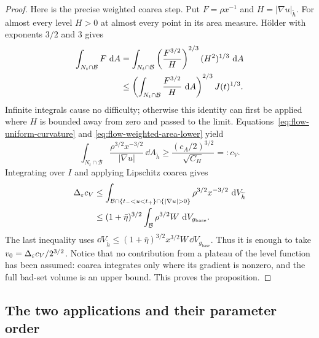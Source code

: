 \begin{proof}
Here is the precise weighted coarea step.  Put $F=\rho x^{-1}$ and
$H=|\nabla u|_{\widetilde h}$.  For almost every level $H>0$ at
almost every point in its area measure.  H\"older with exponents
$3/2$ and $3$ gives
\begin{align}\label{eq:flow-holder-exponents}
 \int_{N_t\cap\mathcal B}F\,\mathop{}\!\mathrm d A
 &=\int_{N_t\cap\mathcal B}
       \left(\frac{F^{3/2}}H\right)^{2/3}(H^2)^{1/3}\,\mathop{}\!\mathrm d A\notag\\
 &\le
 \left(\int_{N_t\cap\mathcal B}\frac{F^{3/2}}H\,\mathop{}\!\mathrm d A\right)^{2/3}
 J(t)^{1/3}.
\end{align}
Infinite integrals cause no difficulty; otherwise this identity can
first be applied where $H$ is bounded away from zero and passed to
the limit.  Equations~\eqref{eq:flow-uniform-curvature} and
\eqref{eq:flow-weighted-area-lower} yield
\begin{equation}\label{eq:flow-level-volume-lower}
 \int_{N_t\cap\mathcal B}
       \frac{\rho^{3/2}x^{-3/2}}{|\nabla u|}\,\dd A_{\widetilde h}
 \ge \frac{(c_A/2)^{3/2}}{\sqrt{C_H}}=:c_V.
\end{equation}
Integrating over $I$ and applying Lipschitz coarea gives
\begin{align}\label{eq:flow-coarea-contradiction}
 \Delta_\eps c_V
 &\le\int_{\mathcal B\cap\{t_-<u<t_+\}\cap\{|\nabla u|>0\}}
                  \rho^{3/2}x^{-3/2}\,\dd V_{\widetilde h}\notag\\
 &\le(1+\bar\eta)^{3/2}
       \int_{\mathcal B}\rho^{3/2}W\,\dd V_{g_{\mathrm{base}}}.
\end{align}
The last inequality uses
$\dd V_{\widetilde h}\le
(1+\bar\eta)^{3/2}x^{3/2}W\,\dd V_{g_{\mathrm{base}}}$.
Thus it is enough to take
$v_0=\Delta_\varepsilon c_V/2^{3/2}$.
Notice that no contribution from a plateau of the level function
has been assumed: coarea integrates only where its gradient is
nonzero, and the full bad-set volume is an upper bound.  This proves
the proposition.
\end{proof}

\subsection{The two applications and their parameter order}


